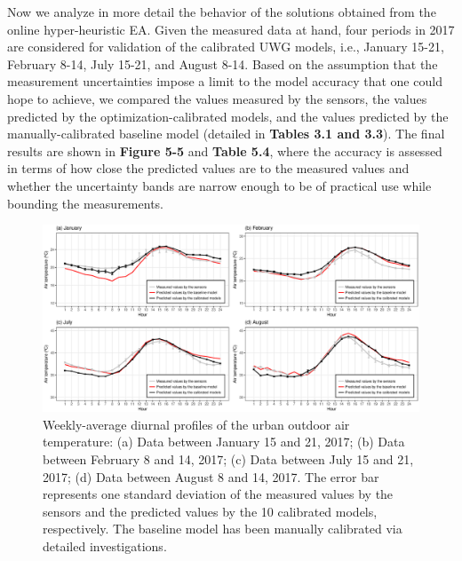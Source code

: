 Now we analyze in more detail the behavior of the solutions obtained from the online hyper-heuristic EA. Given the measured data at hand, four periods in 2017 are considered for validation of the calibrated UWG models, i.e., January 15-21, February 8-14, July 15-21, and August 8-14. Based on the assumption that the measurement uncertainties impose a limit to the model accuracy that one could hope to achieve, we compared the values measured by the sensors, the values predicted by the optimization-calibrated models, and the values predicted by the manually-calibrated baseline model (detailed in \textbf{Tables 3.1 and 3.3}). The final results are shown in \textbf{Figure 5-5} and \textbf{Table 5.4}, where the accuracy is assessed in terms of how close the predicted values are to the measured values and whether the uncertainty bands are narrow enough to be of practical use while bounding the measurements.

\begin{figure}[]
\centering
\includegraphics[width=\linewidth]{Figure5-5.eps}
\caption{Weekly-average diurnal profiles of the urban outdoor air temperature: (a) Data between January 15 and 21, 2017; (b) Data between February 8 and 14, 2017; (c) Data between July 15 and 21, 2017; (d) Data between August 8 and 14, 2017. The error bar represents one standard deviation of the measured values by the sensors and the predicted values by the 10 calibrated models, respectively. The baseline model has been manually calibrated via detailed investigations.}
\end{figure}

